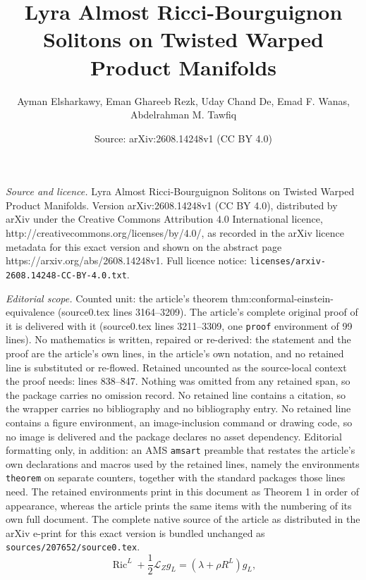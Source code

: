\documentclass[10pt,a4paper]{amsart}
\title{Lyra Almost Ricci-Bourguignon Solitons on Twisted Warped Product Manifolds}
\author{Ayman Elsharkawy, Eman Ghareeb Rezk, Uday Chand De, Emad F. Wanas, Abdelrahman M. Tawfiq}
\date{Source: arXiv:2608.14248v1 (CC BY 4.0)}
\begin{document}
\maketitle

\noindent\emph{Source and licence.} Lyra Almost Ricci-Bourguignon Solitons on Twisted Warped Product Manifolds. Version arXiv:2608.14248v1 (CC BY 4.0), distributed by arXiv under the Creative Commons Attribution 4.0 International licence, http://creativecommons.org/licenses/by/4.0/, as recorded in the arXiv licence metadata for this exact version and shown on the abstract page https://arxiv.org/abs/2608.14248v1. Full licence notice: \texttt{licenses/arxiv-2608.14248-CC-BY-4.0.txt}.\par\smallskip

\noindent\textit{Editorial scope.} Counted unit: the article's theorem thm:conformal-einstein-equivalence (source0.tex lines 3164--3209). The article's complete original proof of it is delivered with it (source0.tex lines 3211--3309, one \texttt{proof} environment of 99 lines). No mathematics is written, repaired or re-derived: the statement and the proof are the article's own lines, in the article's own notation, and no retained line is substituted or re-flowed.  Retained uncounted as the source-local context the proof needs: lines 838--847.  Nothing was omitted from any retained span, so the package carries no omission record.  No retained line contains a citation, so the wrapper carries no bibliography and no bibliography entry.  No retained line contains a figure environment, an image-inclusion command or drawing code, so no image is delivered and the package declares no asset dependency.  Editorial formatting only, in addition: an AMS \texttt{amsart} preamble that restates the article's own declarations and macros used by the retained lines, namely the environments \texttt{theorem} on separate counters, together with the standard packages those lines need.  The retained environments print in this document as Theorem 1 in order of appearance, whereas the article prints the same items with the numbering of its own full document.  The complete native source of the article as distributed in the arXiv e-print for this exact version is bundled unchanged as \texttt{sources/207652/source0.tex}.
	\begin{equation}
		\operatorname{Ric}^{L}
		+
		\frac{1}{2}\mathcal L_{Z}g_{L}
		=
		\left(
		\lambda+\rho R^{L}
		\right)g_{L},
		\label{eq:lyra-arbs-equation}
	\end{equation}
\end{document}
